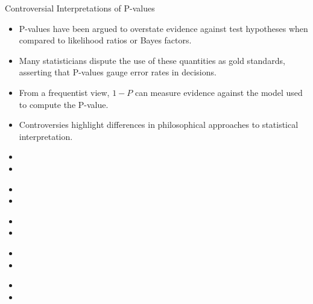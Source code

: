 \documentclass[aspectratio=169, 12pt]{beamer}
\begin{document}
\begin{frame}{Controversial Interpretations of P-values}
\begin{itemize}
    \item P-values have been argued to overstate evidence against test hypotheses when compared to likelihood ratios or Bayes factors.
    \item Many statisticians dispute the use of these quantities as gold standards, asserting that P-values gauge error rates in decisions.
    \item From a frequentist view, \( 1 - P \) can measure evidence against the model used to compute the P-value.
    \item Controversies highlight differences in philosophical approaches to statistical interpretation.
\end{itemize}
\end{frame}

\begin{frame}{} 
\begin{itemize}
    \item
    \item
\end{itemize}
\end{frame}

\begin{frame}{}
\begin{itemize}
    \item
    \item
\end{itemize}
\end{frame}

\begin{frame}{}
\begin{itemize}
    \item
    \item
\end{itemize}
\end{frame}

\begin{frame}{}
\begin{itemize}
    \item
    \item
\end{itemize}
\end{frame}

\begin{frame}{}
\begin{itemize}
    \item
    \item
\end{itemize}
\end{frame}
\end{document}
